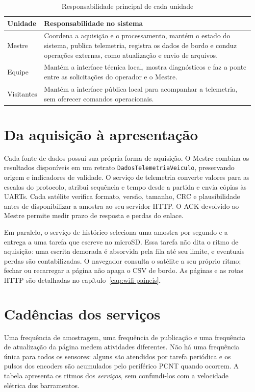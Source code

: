 \begin{table}[htbp]\centering\small
\caption{Responsabilidade principal de cada unidade}\label{tab:unidades}
\begin{tabularx}{\textwidth}{@{}p{2.7cm}X@{}}\toprule
Unidade & Responsabilidade no sistema\\\midrule
Mestre & Coordena a aquisição e o processamento, mantém o estado do sistema, publica telemetria, registra os dados de bordo e conduz operações externas, como atualização e envio de arquivos.\\
Equipe & Mantém a interface técnica local, mostra diagnósticos e faz a ponte entre as solicitações do operador e o Mestre.\\
Visitantes & Mantém a interface pública local para acompanhar a telemetria, sem oferecer comandos operacionais.\\\bottomrule
\end{tabularx}\end{table}

\section{Da aquisição à apresentação}
Cada fonte de dados possui sua própria forma de aquisição. O Mestre combina os resultados disponíveis em um retrato \texttt{DadosTelemetriaVeiculo}, preservando origem e indicadores de validade. O serviço de telemetria converte valores para as escalas do protocolo, atribui sequência e tempo desde a partida e envia cópias às UARTs. Cada satélite verifica formato, versão, tamanho, CRC e plausibilidade antes de disponibilizar a amostra ao seu servidor HTTP. O ACK devolvido ao Mestre permite medir prazo de resposta e perdas do enlace.

Em paralelo, o serviço de histórico seleciona uma amostra por segundo e a entrega a uma tarefa que escreve no microSD. Essa tarefa não dita o ritmo de aquisição: uma escrita demorada é absorvida pela fila até seu limite, e eventuais perdas são contabilizadas. O navegador consulta o satélite a seu próprio ritmo; fechar ou recarregar a página não apaga o CSV de bordo. As páginas e as rotas HTTP são detalhadas no capítulo~\ref{cap:wifi-paineis}.

\section{Cadências dos serviços}
Uma frequência de amostragem, uma frequência de publicação e uma frequência de atualização da página medem atividades diferentes. Não há uma frequência única para todos os sensores: alguns são atendidos por tarefa periódica e os pulsos dos encoders são acumulados pelo periférico PCNT quando ocorrem. A tabela apresenta os ritmos dos \emph{serviços}, sem confundi-los com a velocidade elétrica dos barramentos.

